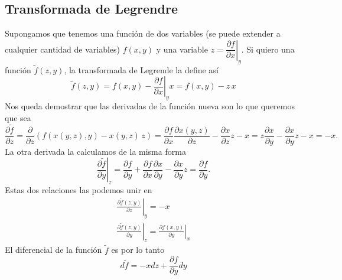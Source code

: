 \subsection{Transformada de Legrendre}
Supongamos que tenemos una función de dos variables (se puede extender a cualquier cantidad de variables) $f(x,y)$ y una variable $z = \left.\dfrac{\partial f}{\partial x}\right|_y$.
Si quiero una función $\tilde{f}(z,y)$, la transformada de Legrende la define así
\begin{equation}
\tilde{f}(z,y) = f(x,y) - \left.\frac{\partial f}{\partial x}\right|_y x = f(x,y) - z\, x
\label{eq:legendre}
\end{equation}
Nos queda demostrar que las derivadas de la función nueva son lo que queremos que sea
\[\frac{\partial \tilde{f}}{\partial z} = \frac{\partial}{\partial z} \left( f(x(y,z),y) - x(y,z) \, z \right) = \frac{\partial f}{\partial x} \frac{\partial x(y,z)}{\partial z} - \frac{\partial x}{\partial z} z - x = z \frac{\partial x}{\partial y} - \frac{\partial x}{\partial y} z - x = - x.\]
La otra derivada la calculamos de la misma forma
\[\left.\frac{\partial \tilde{f}}{\partial y}\right|_z = \frac{\partial f}{\partial y} + \frac{\partial f}{\partial x} \frac{\partial x}{\partial y} - \frac{\partial x}{\partial y} z = \frac{\partial f}{\partial y}.\]
Estas dos relaciones las podemos unir en
\begin{equation}
\begin{gathered}
\left.\frac{\partial \tilde{f}(z,y)}{\partial z}\right|_y = - x\\
\left.\frac{\partial \tilde{f}(z,y)}{\partial y}\right|_z = \left.\frac{\partial f(x,y)}{\partial y}\right|_x
\end{gathered}
\end{equation}
El diferencial de la función $\tilde{f}$ es por lo tanto
\begin{equation}
d\tilde{f} = -x dz + \frac{\partial f}{\partial y} dy
\end{equation}
